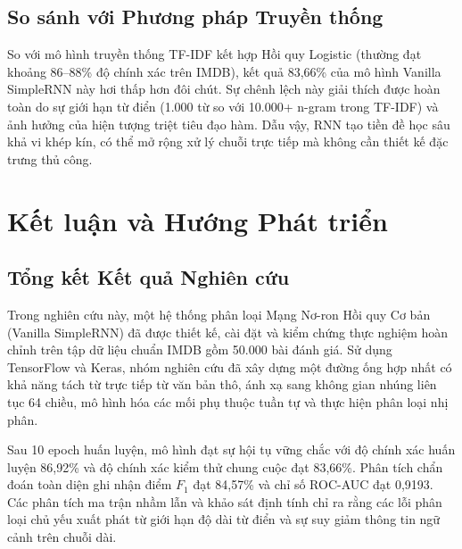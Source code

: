 \documentclass[11pt,a4paper]{article}
\begin{document}
\subsection{So sánh với Phương pháp Truyền thống}
So với mô hình truyền thống TF-IDF kết hợp Hồi quy Logistic (thường đạt khoảng 86--88\% độ chính xác trên IMDB), kết quả 83,66\% của mô hình Vanilla SimpleRNN này hơi thấp hơn đôi chút. Sự chênh lệch này giải thích được hoàn toàn do sự giới hạn từ điển (1.000 từ so với 10.000+ n-gram trong TF-IDF) và ảnh hưởng của hiện tượng triệt tiêu đạo hàm. Dẫu vậy, RNN tạo tiền đề học sâu khả vi khép kín, có thể mở rộng xử lý chuỗi trực tiếp mà không cần thiết kế đặc trưng thủ công.

\section{Kết luận và Hướng Phát triển}
\label{sec:conclusion}

\subsection{Tổng kết Kết quả Nghiên cứu}
Trong nghiên cứu này, một hệ thống phân loại Mạng Nơ-ron Hồi quy Cơ bản (Vanilla SimpleRNN) đã được thiết kế, cài đặt và kiểm chứng thực nghiệm hoàn chỉnh trên tập dữ liệu chuẩn IMDB gồm 50.000 bài đánh giá. Sử dụng TensorFlow và Keras, nhóm nghiên cứu đã xây dựng một đường ống hợp nhất có khả năng tách từ trực tiếp từ văn bản thô, ánh xạ sang không gian nhúng liên tục 64 chiều, mô hình hóa các mối phụ thuộc tuần tự và thực hiện phân loại nhị phân.

Sau 10 epoch huấn luyện, mô hình đạt sự hội tụ vững chắc với độ chính xác huấn luyện 86,92\% và độ chính xác kiểm thử chung cuộc đạt 83,66\%. Phân tích chẩn đoán toàn diện ghi nhận điểm $F_1$ đạt 84,57\% và chỉ số ROC-AUC đạt 0,9193. Các phân tích ma trận nhầm lẫn và khảo sát định tính chỉ ra rằng các lỗi phân loại chủ yếu xuất phát từ giới hạn độ dài từ điển và sự suy giảm thông tin ngữ cảnh trên chuỗi dài.
\end{document}
